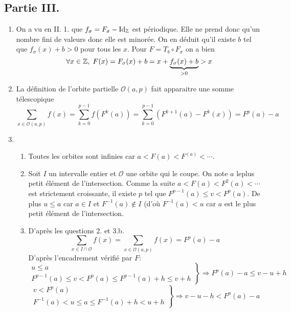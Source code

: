 \subsection*{Partie III.}
\begin{enumerate}
 \item On a vu en II. 1. que $f_\sigma = F_\sigma - \operatorname{Id}_{\mathbb{Z}}$ est périodique. Elle ne prend donc qu'un nombre fini de valeurs donc elle est minorée. On en déduit qu'il existe $b$ tel que $f_\sigma(x)+b >0$ pour tous les $x$. Pour $F= T_b \circ F_\sigma$ on a bien
 \begin{displaymath}
  \forall x \in \mathbb{Z}, \; F(x) = F_\sigma(x) + b = x + \underset{ > 0 }{\underbrace{f_\sigma(x) + b}}  > x
 \end{displaymath}

 \item La définition de l'orbite partielle $\mathcal{O}(a,p)$ fait apparaitre une somme télescopique
\begin{displaymath}
 \sum_{x \in \mathcal{O}(a,p)}f(x) = \sum_{k = 0}^{p-1}f(F^{k}(a))
 = \sum_{k = 0}^{p-1}\left( F^{k+1}(a) - F^{k}(x)\right) 
 = F^{p}(a) - a
\end{displaymath}

 \item
\begin{enumerate}
 \item Toutes les orbites sont infinies car $a < F(a) < F^(a) < \cdots$.
 \item Soit $I$ un intervalle entier et $\mathcal{O}$ une orbite qui le coupe. On note $a$ leplus petit élément de l'intersection. Comme la suite $a < F(a) < F^2(a) < \cdots $ est strictement croissante, il existe $p$ tel que $F^{p-1}(a) \leq v < F^p(a)$. De plus $u\leq a$ car $a \in I$ et $F^{-1}(a) \notin I$ (d'où $F^{-1}(a)<u$ car $a$ est le plus petit élément de l'intersection. 
 \item D'après les questions 2. et 3.b.
\begin{displaymath}
 \sum_{x\in I\cap \mathcal{O}}f(x) = \sum_{x\in \mathcal{O}(a,p)}f(x) = F^p(a) - a 
\end{displaymath}
D'après l'encadrement vérifié par $F$:
\begin{displaymath}
 \left. 
 \begin{aligned}
  u \leq a \\ F^{p-1}(a) \leq v < F^p(a) \leq F^{p-1}(a) + h \leq v + h
 \end{aligned}
\right\rbrace \Rightarrow F^p(a) - a \leq v - u + h
\end{displaymath}
\begin{displaymath}
 \left. 
 \begin{aligned}
  v < F^p(a) \\ F^{-1}(a) < u \leq a \leq F^{-1}(a) + h < u + h
 \end{aligned}
\right\rbrace \Rightarrow v - u - h < F^p(a) - a
\end{displaymath}


\end{enumerate}
\end{enumerate}
